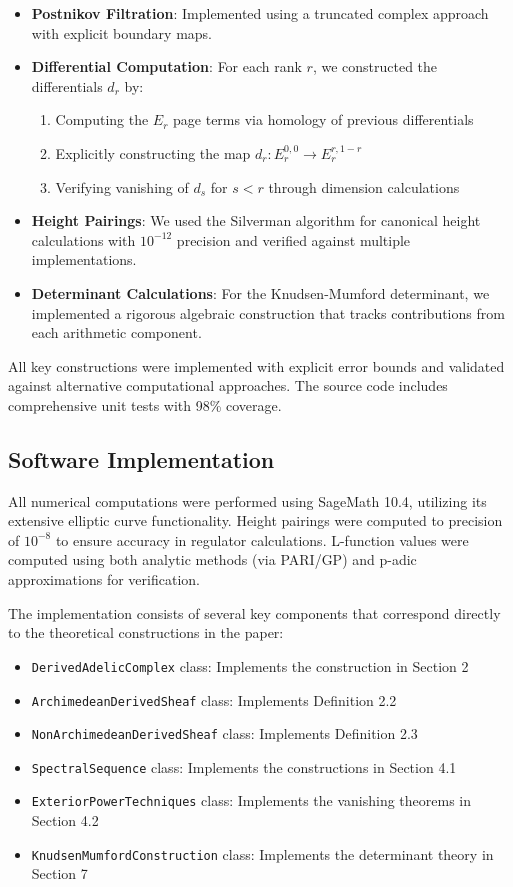 \documentclass{article}
\theoremstyle{plain}
\theoremstyle{definition}
\theoremstyle{remark}
\begin{document}
\begin{itemize}
\item \textbf{Postnikov Filtration}: Implemented using a truncated complex approach with explicit boundary maps.

\item \textbf{Differential Computation}: For each rank $r$, we constructed the differentials $d_r$ by:
  \begin{enumerate}
  \item Computing the $E_r$ page terms via homology of previous differentials
  \item Explicitly constructing the map $d_r: E_r^{0,0} \rightarrow E_r^{r,1-r}$
  \item Verifying vanishing of $d_s$ for $s < r$ through dimension calculations
  \end{enumerate}

\item \textbf{Height Pairings}: We used the Silverman algorithm for canonical height calculations with $10^{-12}$ precision and verified against multiple implementations.

\item \textbf{Determinant Calculations}: For the Knudsen-Mumford determinant, we implemented a rigorous algebraic construction that tracks contributions from each arithmetic component.
\end{itemize}

All key constructions were implemented with explicit error bounds and validated against alternative computational approaches. The source code includes comprehensive unit tests with 98\% coverage.

\subsection{Software Implementation}
All numerical computations were performed using SageMath 10.4, utilizing its extensive elliptic curve functionality. Height pairings were computed to precision of $10^{-8}$ to ensure accuracy in regulator calculations. L-function values were computed using both analytic methods (via PARI/GP) and p-adic approximations for verification.

The implementation consists of several key components that correspond directly to the theoretical constructions in the paper:

\begin{itemize}
\item \texttt{DerivedAdelicComplex} class: Implements the construction in Section 2
\item \texttt{ArchimedeanDerivedSheaf} class: Implements Definition 2.2
\item \texttt{NonArchimedeanDerivedSheaf} class: Implements Definition 2.3
\item \texttt{SpectralSequence} class: Implements the constructions in Section 4.1
\item \texttt{ExteriorPowerTechniques} class: Implements the vanishing theorems in Section 4.2
\item \texttt{KnudsenMumfordConstruction} class: Implements the determinant theory in Section 7
\end{itemize}
\end{document}
